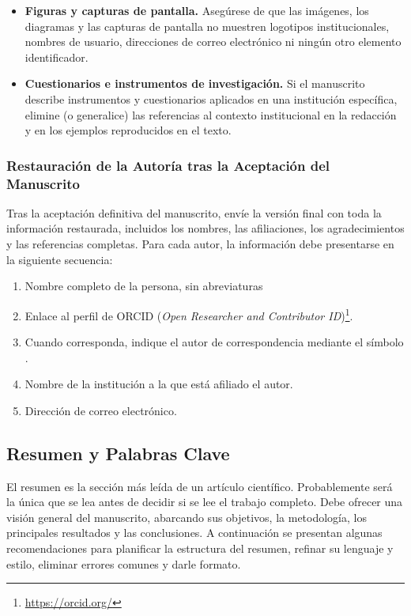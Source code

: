 \documentclass[spanish]{rbie2026}%
\begin{document}
\begin{itemize}
    \item \textbf{Figuras y capturas de pantalla.} Asegúrese de que las imágenes, los diagramas y las capturas de pantalla no muestren logotipos institucionales, nombres de usuario, direcciones de correo electrónico ni ningún otro elemento identificador.

    \item \textbf{Cuestionarios e instrumentos de investigación.} Si el manuscrito describe instrumentos y cuestionarios aplicados en una institución específica, elimine (o generalice) las referencias al contexto institucional en la redacción y en los ejemplos reproducidos en el texto.
\end{itemize}


\subsubsection{Restauración de la Autoría tras la Aceptación del Manuscrito}

Tras la aceptación definitiva del manuscrito, envíe la versión final con toda la información restaurada, incluidos los nombres, las afiliaciones, los agradecimientos y las referencias completas. Para cada autor, la información debe presentarse en la siguiente secuencia:

\begin{enumerate}
    \item Nombre completo de la persona, sin abreviaturas

    \item Enlace al perfil de ORCID (\textit{Open Researcher and Contributor ID})\footnote{\url{https://orcid.org/}}.

    \item Cuando corresponda, indique el autor de correspondencia mediante el símbolo \textcolor{blue}{\faEnvelopeO}.

    \item Nombre de la institución a la que está afiliado el autor.

    \item Dirección de correo electrónico.
\end{enumerate}


\subsection{Resumen y Palabras Clave}

El resumen es la sección más leída de un artículo científico. Probablemente será la única que se lea antes de decidir si se lee el trabajo completo. Debe ofrecer una visión general del manuscrito, abarcando sus objetivos, la metodología, los principales resultados y las conclusiones. A continuación se presentan algunas recomendaciones para planificar la estructura del resumen, refinar su lenguaje y estilo, eliminar errores comunes y darle formato.
\end{document}
